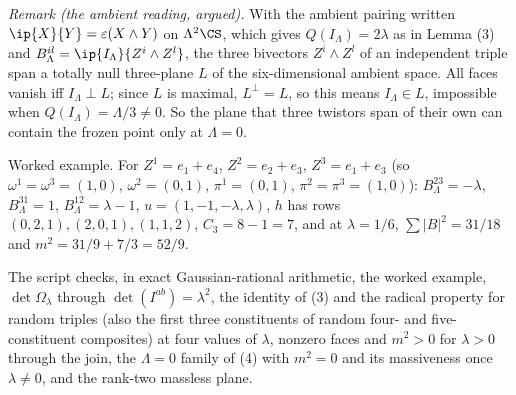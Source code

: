 \emph{Remark (the ambient reading, argued).} With the ambient pairing written $\ip{X}{Y} = \varepsilon(X\wedge Y)$ on $\Lambda^{2}\CS$, which gives $Q(I_{\Lambda}) = 2\lambda$ as in Lemma (3) and $B^{il}_{\Lambda} = \ip{I_{\Lambda}}{Z^{i}\wedge Z^{l}}$, the three bivectors $Z^{i}\wedge Z^{l}$ of an independent triple span a totally null three-plane $L$ of the six-dimensional ambient space. All faces vanish iff $I_{\Lambda} \perp L$; since $L$ is maximal, $L^{\perp} = L$, so this means $I_{\Lambda} \in L$, impossible when $Q(I_{\Lambda}) = \Lambda/3 \ne 0$. So the plane that three twistors span of their own can contain the frozen point only at $\Lambda = 0$.

Worked example. For $Z^{1} = e_{1} + e_{4}$, $Z^{2} = e_{2} + e_{3}$, $Z^{3} = e_{1} + e_{3}$ (so $\omega^{1} = \omega^{3} = (1,0)$, $\omega^{2} = (0,1)$, $\pi^{1} = (0,1)$, $\pi^{2} = \pi^{3} = (1,0)$): $B^{23}_{\Lambda} = -\lambda$, $B^{31}_{\Lambda} = 1$, $B^{12}_{\Lambda} = \lambda - 1$, $u = (1, -1, -\lambda, \lambda)$, $h$ has rows $(0,2,1), (2,0,1), (1,1,2)$, $C_{3} = 8 - 1 = 7$, and at $\lambda = 1/6$, $\sum|B|^{2} = 31/18$ and $m^{2} = 31/9 + 7/3 = 52/9$.

The script checks, in exact Gaussian-rational arithmetic, the worked example, $\det\Omega_{\lambda}$ through $\det(I^{ab}) = \lambda^{2}$, the identity of (3) and the radical property for random triples (also the first three constituents of random four- and five-constituent composites) at four values of $\lambda$, nonzero faces and $m^{2} > 0$ for $\lambda > 0$ through the join, the $\Lambda = 0$ family of (4) with $m^{2} = 0$ and its massiveness once $\lambda \ne 0$, and the rank-two massless plane.
